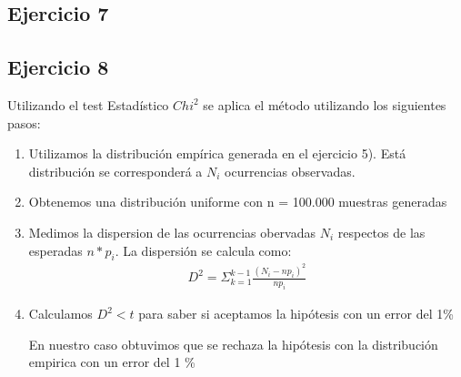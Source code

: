 \documentclass[11pt,a4paper]{article}
\begin{document}
	\subsection{Ejercicio 7}


	\subsection{Ejercicio 8}
	Utilizando el test Estadístico $Chi^2$ se aplica el método utilizando los siguientes pasos:
	\begin{enumerate}
		\item Utilizamos la distribución empírica generada en el ejercicio 5). Está distribución se corresponderá a $N_i$ ocurrencias observadas.
		\item Obtenemos una distribución uniforme con n = 100.000 muestras generadas
		\item Medimos la dispersion de las ocurrencias obervadas $N_i$ respectos de las esperadas $n*p_i$. La dispersión se calcula como:
		\begin{align*}
		D^2 = \Sigma_{k=1}^{k-1} \frac{(N_i - np_i)^2}{np_i}
		\end{align*}
		\item Calculamos $D^2 < t$ para saber si aceptamos la hipótesis  con un error del 1\%
		
		En nuestro caso obtuvimos que se rechaza la hipótesis con la distribución empirica con un error del 1 \%
	\end{enumerate}
\end{document}
